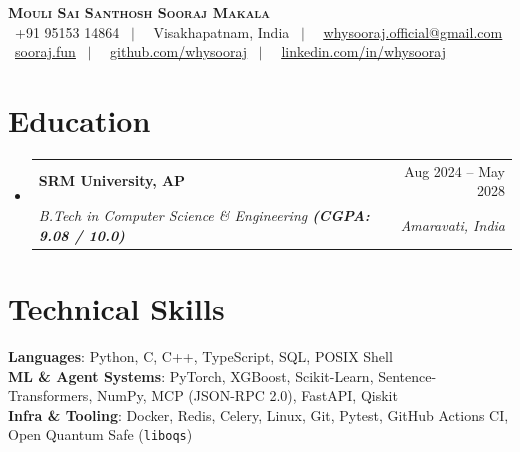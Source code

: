 \documentclass[letterpaper,11pt]{article}
\makeatletter
\newcommand{\resumeSubheading}[4]{
  \vspace{-2pt}\item
    \begin{tabular*}{0.97\textwidth}[t]{l@{\extracolsep{\fill}}r}
      \textbf{#1} & #2 \\
      \textit{\small#3} & \textit{\small #4} \\
    \end{tabular*}\vspace{-7pt}
}
\newcommand{\resumeSubHeadingListStart}{\begin{itemize}[leftmargin=0.15in, label={}]}
\newcommand{\resumeSubHeadingListEnd}{\end{itemize}}
\makeatother
\begin{document}
\begin{center}
    \textbf{\Huge \scshape Mouli Sai Santhosh Sooraj Makala} \\ \vspace{4pt}
    \small \faPhone* \ +91 95153 14864 \ $|$ \
    \faMapMarker* \ Visakhapatnam, India \ $|$ \
    \faEnvelope \ \href{mailto:whysooraj.official@gmail.com}{\underline{whysooraj.official@gmail.com}} \\ \vspace{2pt}
    \faGlobe \ \href{https://sooraj.fun}{\underline{sooraj.fun}} \ $|$ \
    \faGithub \ \href{https://github.com/whysooraj}{\underline{github.com/whysooraj}} \ $|$ \
    \faLinkedin \ \href{https://linkedin.com/in/whysooraj}{\underline{linkedin.com/in/whysooraj}}
\end{center}

\section{Education}
  \resumeSubHeadingListStart
    \resumeSubheading
      {SRM University, AP}{Aug 2024 -- May 2028}
      {B.Tech in Computer Science \& Engineering \textbf{(CGPA: 9.08 / 10.0)}}{Amaravati, India}
  \resumeSubHeadingListEnd

\section{Technical Skills}
 \begin{itemize}[leftmargin=0.15in, label={}]
    \small{\item{
     \textbf{Languages}{: Python, C, C++, TypeScript, SQL, POSIX Shell} \\
     \textbf{ML \& Agent Systems}{: PyTorch, XGBoost, Scikit-Learn, Sentence-Transformers, NumPy, MCP (JSON-RPC 2.0), FastAPI, Qiskit} \\
     \textbf{Infra \& Tooling}{: Docker, Redis, Celery, Linux, Git, Pytest, GitHub Actions CI, Open Quantum Safe (\texttt{liboqs})}
    }}
 \end{itemize}

\end{document}
